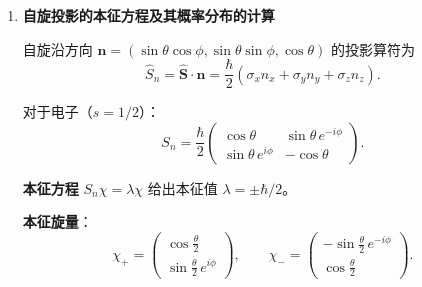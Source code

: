 \begin{enumerate}[label=\textbf{\arabic*.}, leftmargin=2em, itemsep=0.8em]
\textbf{解}：
\begin{enumerate}[nosep, label=Step \arabic*.]
    \item \textbf{验证厄米性}：
    \[
        A^\dagger = (A^*)^T = \begin{pmatrix} 1 & i \\ -i & 2 \end{pmatrix}^T = \begin{pmatrix} 1 & -i \\ i & 2 \end{pmatrix}^T \,?\,
    \]
    更正：直接计算共轭转置
    \[
        A^\dagger = \begin{pmatrix} 1^* & (-i)^* \\ i^* & 2^* \end{pmatrix}^T
        = \begin{pmatrix} 1 & i \\ -i & 2 \end{pmatrix} = A.
    \]
    故 $A$ 为厄米矩阵。
    \item \textbf{久期方程} $\det(A - \lambda I) = 0$：
    \[
        \begin{vmatrix} 1-\lambda & i \\ -i & 2-\lambda \end{vmatrix}
        = (1-\lambda)(2-\lambda) - (i)(-i)
        = (1-\lambda)(2-\lambda) - 1 = 0.
    \]
    展开：$\lambda^2 - 3\lambda + 1 = 0$。
    \item \textbf{本征值}：
    \[
        \lambda_{1,2} = \frac{3 \pm \sqrt{5}}{2}.
    \]
    均为实数，符合厄米矩阵性质。
\end{enumerate}

\item \textbf{自旋投影的本征方程及其概率分布的计算}

自旋沿方向 $\mathbf{n} = (\sin\theta\cos\phi, \sin\theta\sin\phi, \cos\theta)$ 的投影算符为
\[
    \hat{S}_n = \hat{\mathbf{S}}\cdot\mathbf{n} = \frac{\hbar}{2}(\sigma_x n_x + \sigma_y n_y + \sigma_z n_z).
\]

对于电子（$s=1/2$）：
\[
    S_n = \frac{\hbar}{2}\begin{pmatrix} \cos\theta & \sin\theta\,e^{-i\phi} \\ \sin\theta\,e^{i\phi} & -\cos\theta \end{pmatrix}.
\]

\textbf{本征方程} $S_n\chi = \lambda\chi$ 给出本征值 $\lambda = \pm\hbar/2$。

\textbf{本征旋量}：
\[
    \chi_+ = \begin{pmatrix} \cos\frac{\theta}{2} \\ \sin\frac{\theta}{2}\,e^{i\phi} \end{pmatrix},\qquad
    \chi_- = \begin{pmatrix} -\sin\frac{\theta}{2}\,e^{-i\phi} \\ \cos\frac{\theta}{2} \end{pmatrix}.
\]


\end{enumerate}
